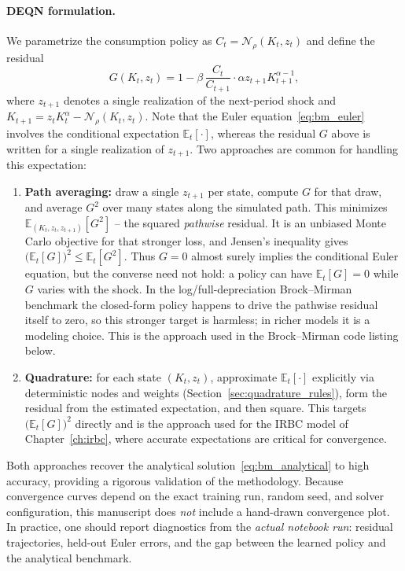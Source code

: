 \documentclass[11pt,a4paper]{report}
\begin{document}
\paragraph{DEQN formulation.}  We parametrize the consumption policy as $C_t = \mathcal{N}_\rho(K_t, z_t)$ and define the residual
\begin{equation}
G(K_t, z_t) = 1 - \beta \, \frac{C_t}{C_{t+1}} \cdot \alpha z_{t+1} K_{t+1}^{\alpha-1},
\end{equation}
where $z_{t+1}$ denotes a single realization of the next-period shock and $K_{t+1} = z_t K_t^\alpha - \mathcal{N}_\rho(K_t, z_t)$.  Note that the Euler equation~\eqref{eq:bm_euler} involves the conditional expectation $\mathbb{E}_t[\cdot]$, whereas the residual $G$ above is written for a single realization of $z_{t+1}$.  Two approaches are common for handling this expectation:
\begin{enumerate}[itemsep=2pt]
\item \textbf{Path averaging:} draw a single $z_{t+1}$ per state, compute $G$ for that draw, and average $G^2$ over many states along the simulated path.  This minimizes $\mathbb{E}_{(K_t,z_t,z_{t+1})}[G^2]$ -- the squared \emph{pathwise} residual.  It is an unbiased Monte Carlo objective for that stronger loss, and Jensen's inequality gives $\bigl(\mathbb{E}_t[G]\bigr)^2 \leq \mathbb{E}_t[G^2]$.  Thus $G=0$ almost surely implies the conditional Euler equation, but the converse need not hold: a policy can have $\mathbb{E}_t[G]=0$ while $G$ varies with the shock.  In the log/full-depreciation Brock--Mirman benchmark the closed-form policy happens to drive the pathwise residual itself to zero, so this stronger target is harmless; in richer models it is a modeling choice.  This is the approach used in the Brock--Mirman code listing below.
\item \textbf{Quadrature:} for each state $(K_t, z_t)$, approximate $\mathbb{E}_t[\cdot]$ explicitly via deterministic nodes and weights (Section~\ref{sec:quadrature_rules}), form the residual from the estimated expectation, and then square.  This targets $\bigl(\mathbb{E}_t[G]\bigr)^2$ directly and is the approach used for the IRBC model of Chapter~\ref{ch:irbc}, where accurate expectations are critical for convergence.
\end{enumerate}
Both approaches recover the analytical solution~\eqref{eq:bm_analytical} to high accuracy, providing a rigorous validation of the methodology.  Because convergence curves depend on the exact training run, random seed, and solver configuration, this manuscript does \emph{not} include a hand-drawn convergence plot.  In practice, one should report diagnostics from the \emph{actual notebook run}: residual trajectories, held-out Euler errors, and the gap between the learned policy and the analytical benchmark.
\end{document}
